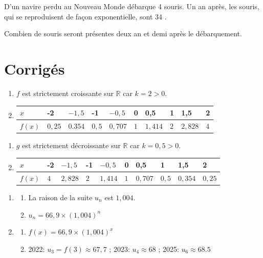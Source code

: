 \documentclass[french]{book}
\begin{document}
\begin{exocor}
D'un navire perdu au Nouveau Monde débarque 4 souris. Un an après, les souris, qui se reproduisent de façon exponentielle, sont 34 .

Combien de souris seront présentes deux an et demi après le débarquement.
\end{exocor}

\newpage

\section{Corrigés}
\begin{corrige}
\begin{enumerate}
\item $f$ est strictement croissante sur $\mathbb{R}$ car $k=2>0$.
\item 
\begin{center}
\begin{tabular}{|l|l|l|l|l|l|l|l|l|l|}
\hline$x$ & -2 & $-1,5$ & -1 & $-0,5$ & 0 & 0,5 & 1 & 1,5 & 2 \\
\hline$f(x)$ & $0,25$ & $0.354$ & $0,5$ & $0,707$ & $1$ & $1,414$ & $2$ & $2,828$ & $4$ \\
\hline
\end{tabular}
\end{center}
\end{enumerate}
\end{corrige}

\begin{corrige}
\begin{enumerate}
\item $g$ est strictement décroissante sur $\mathbb{R}$ car $k=0,5>0$.
\item 
\begin{center}
\begin{tabular}{|l|l|l|l|l|l|l|l|l|l|}
\hline$x$ & -2 & $-1,5$ & -1 & $-0,5$ & 0 & 0,5 & 1 & 1,5 & 2 \\
\hline$f(x)$ & $4$ & $2,828$ & $2$ & $1,414$ & $1$ & $0,707$ & $0,5$ & $0,354$ & $0,25$ \\
\hline
\end{tabular}
\end{center}
\end{enumerate}
\end{corrige}

\begin{corrige}
\begin{enumerate}
\item \begin{enumerate}
\item La raison de la suite $u_n$ est $1,004$.
\item $u_n=66,9 \times (1,004)^n$
\end{enumerate}
\item \begin{enumerate}
\item $f(x)=66,9 \times (1,004)^x$
\item 2022: $u_3=f(3)\approx 67,7$ ; 2023: $u_4\approx 68$ ; 2025: $u_6 \approx 68.5$
\end{enumerate}
\end{enumerate}
\end{corrige}
\end{document}
